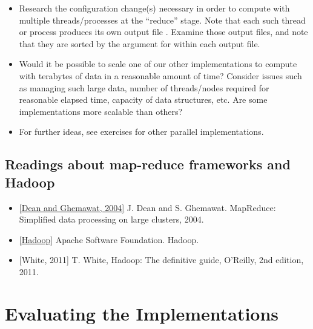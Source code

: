 \documentclass[letterpaper,10pt,openany,oneside]{sphinxmanual}
\begin{document}
\begin{itemize}
\item {} 
Research the configuration change(s) necessary in order to compute with multiple  threads/processes at the “reduce” stage. Note that each such thread or process produces its own output file . Examine those output files, and note that they are sorted by the  argument for  within each output file.

\item {} 
Would it be possible to scale one of our other implementations to compute with terabytes of data in a reasonable amount of time? Consider issues such as managing such large data, number of threads/nodes required for reasonable elapsed time, capacity of data structures, etc. Are some implementations more scalable than others?

\item {} 
For further ideas, see exercises for other parallel implementations.

\end{itemize}


\section{Readings about map-reduce frameworks and Hadoop}
\label{hadoop/hadoop:amdahl-s-law}\label{hadoop/hadoop:readings-about-map-reduce-frameworks-and-hadoop}\begin{itemize}
\item {} 
\href{http://labs.google.com/papers/mapreduce.html}{{[}Dean and Ghemawat, 2004{]}}  J. Dean and S. Ghemawat. MapReduce: Simplified data processing on large clusters, 2004.

\item {} 
\href{http://hadoop.apache.org/core/}{{[}Hadoop{]}}  Apache Software Foundation. Hadoop.

\item {} 
{[}White, 2011{]}  T. White, Hadoop:  The definitive guide, O’Reilly, 2nd edition, 2011.

\end{itemize}


\chapter{Evaluating the Implementations}
\label{evaluation/evaluation::doc}\label{evaluation/evaluation:hadoop}\label{evaluation/evaluation:evaluating-the-implementations}
\end{document}
